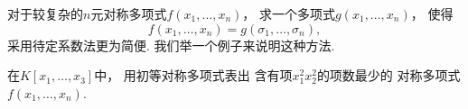 对于较复杂的\(n\)元对称多项式\(f(x_1,\dotsc,x_n)\)，
求一个多项式\(g(x_1,\dotsc,x_n)\)，
使得\[
	f(x_1,\dotsc,x_n)
	=g(\sigma_1,\dotsc,\sigma_n),
\]
采用待定系数法更为简便.
我们举一个例子来说明这种方法.

\begin{example}
在\(K[x_1,\dotsc,x_3]\)中，
用初等对称多项式表出
含有项\(x_1^2 x_2^2\)的项数最少的
对称多项式\(f(x_1,\dotsc,x_n)\).
\end{example}
